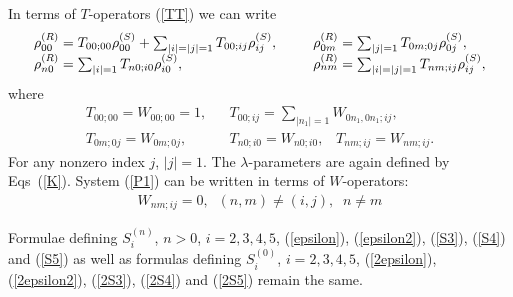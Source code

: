 \documentclass[pra,preprint,showpacs]{revtex4-1}
\begin{document}
{{In terms of $T$-operators (\ref{TT}) we can write
\begin{eqnarray}\begin{array}{lll}
\rho^{(R)}_{00}= T_{00;00} \rho^{(S)}_{00} + \sum_{|i|=|j|=1} T_{00;ij}\rho^{(S)}_{ij},
&~~&
\rho^{(R)}_{0m}=\sum_{|j|=1}T_{0m;0j}\rho^{(S)}_{0j},\cr
\rho^{(R)}_{n0}=\sum_{|i|=1}T_{n0;i0}\rho^{(S)}_{i0},
&~~&
\rho^{(R)}_{nm}=\sum_{|i|=|j|=1}T_{nm;ij}\rho^{(S)}_{ij},
\end{array}
\end{eqnarray}
where
\begin{eqnarray}
T_{00;00}=W_{00;00}=1, &&
T_{00;ij}=\sum_{|n_1|=1} W_{0n_1,0n_1;ij},\\\nonumber
T_{0m;0j}=W_{0m;0j}, &&
T_{n0;i0}=W_{n0;i0}, \;\;\;T_{nm;ij}=W_{nm;ij}.
\end{eqnarray}
For any nonzero index  $j$, $|j|=1$.
The $\lambda$-parameters are again defined by Eqs~(\ref{K}).
System  (\ref{P1}) can be written in terms of $W$-operators:
\begin{eqnarray}\label{constr_red}
 W_{nm;ij}=0, \;\;(n,m)\neq (i,j),\;\; n\neq m
\end{eqnarray}
\iffalse
In additoin, for the diagonal elements of  $\rho^{(R)}$, we have representation (\ref{TNMIJ}):
\begin{eqnarray}\label{TNNIJ}
T_{N_RN_R;I_SJ_S}
 &=& U_{0_S0_{TL}N_R; I_S0_{TL}0_R} U^\dagger_{J_S 0_{TL}0_R; 0_S0_{TL}N_R} ,        \;\;N_R\neq 0_R,
\end{eqnarray}
so that
\begin{eqnarray}\label{TNNIJ1}
    T_{N_RN_R;I_SJ_S} =0 \;\;{\mbox{if}} \;\; N_R\neq I_S \;\;{\mbox{or}}\;\; N_R\neq J_S,\\\label{TNNIJ2}
 T_{N_RN_R;N_RN_R} = |\lambda_{N_R 0_R}|^2.
\end{eqnarray}
In addition,
\begin{eqnarray}
T^{(n)}_{0_R0_R;I_SJ_S} &=& \sum_{{{N_S,N_{TL}}\atop{|N_S|+|N_{TL}|=}}\atop{|I_S|=|J_S|}} U_{N_SN_{TL}0_R; I_S0_{TL}0_R} (U^{(n)})^\dagger_{J_S 0_{TL}0_R; N_SN_{TL}0_R}+\delta_{I_S0_S}\delta_{J_S0_S}.
\end{eqnarray}
Thus, according to (\ref{rhoR}), the diagonal elements  of $\rho^{(R)}$ are all restored except for the element $\rho^{(R)}_{0_R0_R}$.
\fi

Formulae defining $S_i^{(n)}$, $n>0$, $i=2,3,4,5$, (\ref{epsilon}),  (\ref{epsilon2}), (\ref{S3}),  (\ref{S4}) and (\ref{S5}) as well as formulas
defining $S_i^{(0)}$, $i=2,3,4,5$, (\ref{2epsilon}), (\ref{2epsilon2}), (\ref{2S3}), (\ref{2S4})  and (\ref{2S5}) remain the same.

}}
\end{document}
